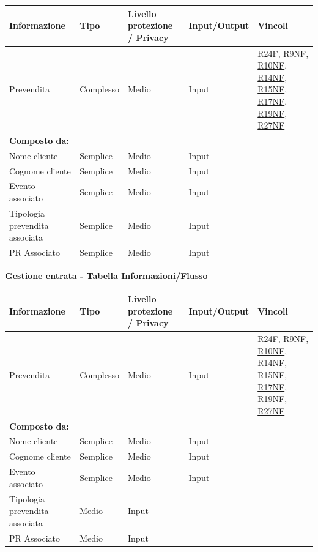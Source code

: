 \documentclass[a4paper]{article}
\begin{document}
\begin{center}
    \begin{tabularx}{1\textwidth}{|X|X|X|X|X|}
        \hline
        \textbf{Informazione} &\textbf{Tipo} & \textbf{Livello protezione / Privacy} & \textbf{Input/Output} & \textbf{Vincoli}\\
        \hline
        \hline
        Prevendita & Complesso & Medio & Input & \hyperlink{R24F}{R24F}, \hyperlink{R9NF}{R9NF}, \hyperlink{R10NF}{R10NF}, \hyperlink{R14NF}{R14NF}, \hyperlink{R15NF}{R15NF}, \hyperlink{R17NF}{R17NF}, \hyperlink{R19NF}{R19NF}, \hyperlink{R27NF}{R27NF} \\
        \textbf{Composto da:} & & & & \\
        Nome cliente & Semplice & Medio & Input & \\
        Cognome cliente & Semplice & Medio & Input & \\
        Evento associato & Semplice & Medio & Input & \\
        Tipologia prevendita associata & Semplice & Medio & Input & \\
        PR Associato & Semplice & Medio & Input & \\
        \hline
    \end{tabularx}
\end{center}

\textbf{Gestione entrata  - Tabella Informazioni/Flusso}

\begin{center}
    \begin{tabularx}{1\textwidth}{|X|X|X|X|X|}
        \hline
        \textbf{Informazione} &\textbf{Tipo} & \textbf{Livello protezione / Privacy} & \textbf{Input/Output} & \textbf{Vincoli}\\
        \hline
        \hline
        Prevendita & Complesso & Medio & Input & \hyperlink{R24F}{R24F}, \hyperlink{R9NF}{R9NF}, \hyperlink{R10NF}{R10NF}, \hyperlink{R14NF}{R14NF}, \hyperlink{R15NF}{R15NF}, \hyperlink{R17NF}{R17NF}, \hyperlink{R19NF}{R19NF}, \hyperlink{R27NF}{R27NF} \\
        \textbf{Composto da:} & & & & \\
        Nome cliente & Semplice & Medio & Input & \\
        Cognome cliente & Semplice & Medio & Input & \\
        Evento associato & Semplice & Medio & Input & \\
        Tipologia prevendita associata & Medio & Input & \\
        PR Associato & Medio & Input & \\
        \hline
    \end{tabularx}
\end{center}
\end{document}
